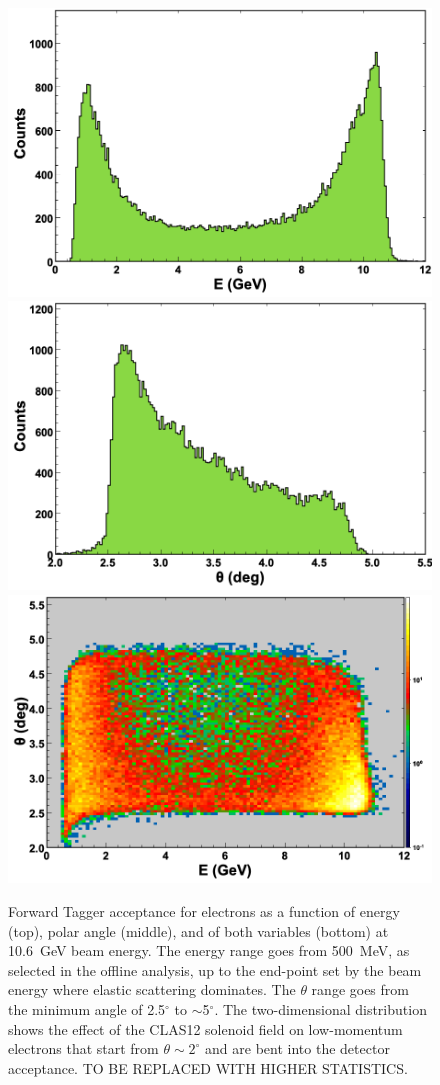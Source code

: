 \begin{figure}[ht]
\begin{center}
\includegraphics[height=0.56\columnwidth]{fig/ft_acceptance_energy.png}
\includegraphics[height=0.56\columnwidth]{fig/ft_acceptance_theta.png}
\includegraphics[height=0.56\columnwidth]{fig/ft_acceptance_energytheta.png}
\end{center}
\caption{Forward Tagger acceptance for electrons as a function of energy (top), polar angle (middle), and of both
  variables (bottom) at 10.6~GeV beam energy. The energy range goes from 500~MeV, as selected in the offline
  analysis, up to the end-point set by the beam energy where elastic scattering dominates. The $\theta$ range goes
  from the minimum angle of 2.5$^\circ$ to $\sim$5$^\circ$. The two-dimensional distribution shows the effect of the
  CLAS12 solenoid field on low-momentum electrons that start from $\theta\sim2^\circ$ and are bent into the
  detector acceptance. TO BE REPLACED WITH HIGHER STATISTICS.}
\label{fig:ft_acceptance}
\end{figure}

